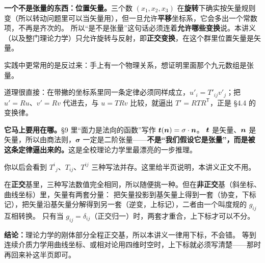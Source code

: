 \documentclass[11pt]{ctexart}
\newcommand{\ten}[1]{\mathbf{#1}}
\let\origsubhdr\subhdr
\renewcommand{\subhdr}[1]{\par\needspace{3\baselineskip}\origsubhdr{#1}}
\begin{document}
\textbf{一个不是张量的东西：位置矢量。}三个数 $(x_1,x_2,x_3)$ 在\textbf{旋转}下确实按矢量规则变（所以转动问题里可以当矢量用），但一旦允许\textbf{平移}坐标系，它会多出一个常数项，不再是齐次的。
所以“是不是张量”这句话必须连着\textbf{允许哪些变换}说。本讲义（以及整门理论力学）只允许旋转与反射，即\textbf{正交变换}，在这个群里位置矢量是矢量。



实践中更常用的是反过来：手上有一个物理关系，想证明里面那个九元数组是张量。

\begin{center}
\end{center}

道理很直接：在带撇的坐标系里同一条定律必须同样成立，$u'_i=T'_{ij}v'_j$；把 $u'=Ru$、$v'=Rv$ 代进去，与 $u=TRv$ 比较，就逼出 $T'=RTR^{\mathsf T}$，正是 §4.4 的变换律。

\textbf{它马上要用在哪。}§9 里“面力是法向的函数”写作 $\vect t(\vect n)=\ten\sigma\cdot\vect n$。
$\boldsymbol{t}$ 是矢量、$\boldsymbol{n}$ 是矢量，所以由商法则，$\ten\sigma$ 一定是二阶张量——\textbf{不是“我们假设它是张量”，而是被这条定律逼出来的。}这是全校理论力学里最漂亮的一步推理。


你以后会看到 $T^{i}{}_{j}$、$T_{ij}$、$T^{ij}$ 三种写法并存。这里给半页说明，本讲义正文不用。

在\textbf{正交}基里，三种写法数值完全相同，所以随便挑一种。但在\textbf{非正交}基（斜坐标、曲线坐标）里，矢量有两套分量：
把矢量投影到基矢量上得到一套（协变，下标记），把矢量沿基矢量分解得到另一套（逆变，上标记），二者由一个叫度规的 $g_{ij}$ 互相转换。
只有当 $g_{ij}=\delta_{ij}$（正交归一）时，两套才重合，上下标才可以不分。

\textbf{结论：}理论力学的刚体部分全程正交基，所以本讲义一律用下标，不会错。
等到连续介质力学用曲线坐标、或相对论用四维时空时，上下标就必须写清楚——那时再回来补这半页即可。
\end{document}
